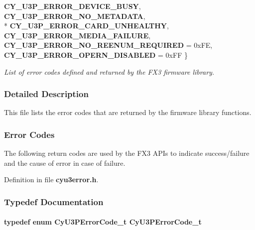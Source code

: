 \begin{DoxyCompactItemize}
{\bf C\+Y\+\_\+\+U3\+P\+\_\+\+E\+R\+R\+O\+R\+\_\+\+D\+E\+V\+I\+C\+E\+\_\+\+B\+U\+SY}, 
{\bf C\+Y\+\_\+\+U3\+P\+\_\+\+E\+R\+R\+O\+R\+\_\+\+N\+O\+\_\+\+M\+E\+T\+A\+D\+A\+TA}, 
\\*
{\bf C\+Y\+\_\+\+U3\+P\+\_\+\+E\+R\+R\+O\+R\+\_\+\+C\+A\+R\+D\+\_\+\+U\+N\+H\+E\+A\+L\+T\+HY}, 
{\bf C\+Y\+\_\+\+U3\+P\+\_\+\+E\+R\+R\+O\+R\+\_\+\+M\+E\+D\+I\+A\+\_\+\+F\+A\+I\+L\+U\+RE}, 
{\bf C\+Y\+\_\+\+U3\+P\+\_\+\+E\+R\+R\+O\+R\+\_\+\+N\+O\+\_\+\+R\+E\+E\+N\+U\+M\+\_\+\+R\+E\+Q\+U\+I\+R\+ED} = 0x\+FE, 
{\bf C\+Y\+\_\+\+U3\+P\+\_\+\+E\+R\+R\+O\+R\+\_\+\+O\+P\+E\+R\+N\+\_\+\+D\+I\+S\+A\+B\+L\+ED} = 0x\+FF
 \}\begin{DoxyCompactList}\small\item\em List of error codes defined and returned by the F\+X3 firmware library. \end{DoxyCompactList}
\end{DoxyCompactItemize}


\subsubsection{Detailed Description}
This file lists the error codes that are returned by the firmware library functions. 

\subsubsection{Error Codes}\label{cyu3error_8h_errorCode}
The following return codes are used by the F\+X3 A\+P\+Is to indicate success/failure and the cause of error in case of failure. 

Definition in file {\bf cyu3error.\+h}.



\subsubsection{Typedef Documentation}
\paragraph[{Cy\+U3\+P\+Error\+Code\+\_\+t}]{\setlength{\rightskip}{0pt plus 5cm}typedef enum {\bf Cy\+U3\+P\+Error\+Code\+\_\+t}  {\bf Cy\+U3\+P\+Error\+Code\+\_\+t}}\label{cyu3error_8h_ab05f4ca55fcc053034ad1f6584c0ebdb}


